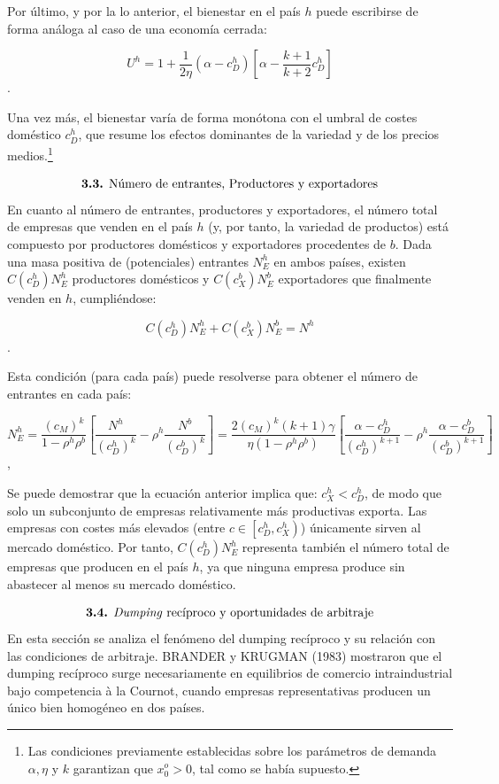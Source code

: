 \documentclass[10pt,a4paper]{article}
\begin{document}
Por último, y por la lo anterior, el bienestar en el país $h$ puede escribirse de forma análoga al caso de una economía cerrada:

$$U^h = 1 + \frac{1}{2\eta} (\alpha - c_D^h)\left[\alpha - \frac{k + 1}{k + 2} c_D^h\right]$$.

Una vez más, el bienestar varía de forma monótona con el umbral de costes doméstico $c_D^h$, que resume los efectos dominantes de la variedad y de los precios medios.\footnote{%
    Las condiciones previamente establecidas sobre los parámetros de demanda $\alpha, \eta$ y $k$ garantizan que $x_0^o > 0$, tal como se había supuesto.
}

$$\text{\textbf{3.3.} Número de entrantes, Productores y exportadores}$$
En cuanto al número de entrantes, productores y exportadores, el número total de empresas que venden en el país $h$ (y, por tanto, la variedad de productos) está compuesto por productores domésticos y exportadores procedentes de $b$. Dada una masa positiva de (potenciales) entrantes $N_E^h$ en ambos países, existen $C(c_D^h) N_E^h$ productores domésticos y $C(c_X^b) N_E^b$ exportadores que finalmente venden en $h$, cumpliéndose:

$$C(c_D^h) N_E^h + C(c_X^b) N_E^b = N^h$$.

Esta condición (para cada país) puede resolverse para obtener el número de entrantes en cada país:

$$N_E^h = \frac{(c_M)^k}{1 - \rho^h \rho^b} \left[ \frac{N^h}{\left(c_D^h\right)^k}-\rho^h\frac{N^b}{\left(c_D^b\right)^k}\right]=\frac{2\left(c_M\right)^k(k+1)\gamma}{\eta(1-\rho^h\rho^b)}\left[\frac{\alpha-c_D^h}{\left(c_D^h\right)^{k+1}}-\rho^h\frac{\alpha-c_D^b}{\left(c_D^b\right)^{k+1}}\right]$$,

Se puede demostrar que la ecuación anterior implica que: $c_X^h < c_D^h$, de modo que solo un subconjunto de empresas relativamente más productivas exporta. Las empresas con costes más elevados (entre $c\in \left[c_D^h,c_X^h\right)$) únicamente sirven al mercado doméstico. Por tanto, $C(c_D^h) N_E^h$ representa también el número total de empresas que producen en el país $h$, ya que ninguna empresa produce sin abastecer al menos su mercado doméstico.

$$\text{\textbf{3.4.} \textit{Dumping} recíproco y oportunidades de arbitraje}$$
En esta sección se analiza el fenómeno del dumping recíproco y su relación con las condiciones de arbitraje. BRANDER y KRUGMAN (1983) mostraron que el dumping recíproco surge necesariamente en equilibrios de comercio intraindustrial bajo competencia à la Cournot, cuando empresas representativas producen un único bien homogéneo en dos países. 
\end{document}
